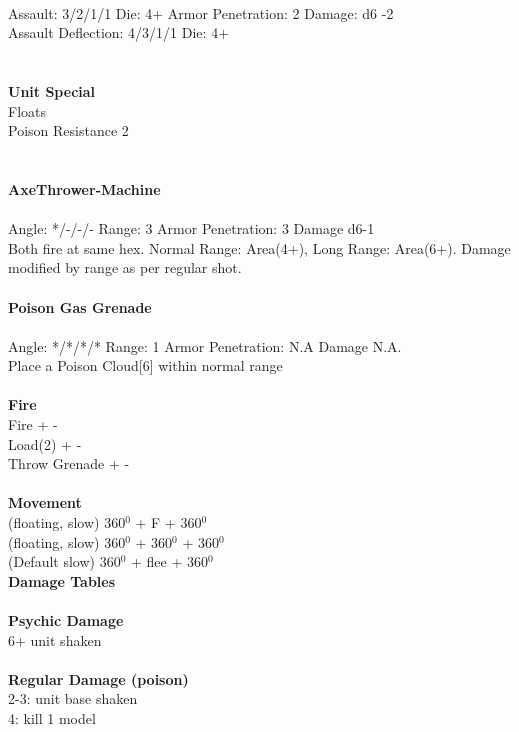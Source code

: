 \ \\
Assault: 3/2/1/1 Die: 4+ Armor Penetration: 2 Damage: d6 -2  \\
Assault Deflection: 4/3/1/1 Die: 4+\\
\indent  \\
\ \\

{\bf Unit Special} \\
Floats\\ Poison Resistance 2 \\ 
\ \\
\ \\
{\bf AxeThrower-Machine } \\
\ \\
Angle: */-/-/- Range: 3 Armor Penetration: 3 Damage d6-1 \\
\indent Both fire at same hex. Normal Range: Area(4+), Long Range: Area(6+). Damage modified by range as per regular shot. \\



\ \\
{\bf Poison Gas Grenade } \\
\ \\
Angle: */*/*/* Range: 1 Armor Penetration: N.A Damage N.A. \\
\indent Place a Poison Cloud[6] within normal range \\





\ \\ {\bf Fire } \\
Fire + - \\
Load(2) + - \\
Throw Grenade + - \\
\ \\ {\bf Movement } \\
(floating, slow) 360$^0$ + F + 360$^0$ \\
(floating, slow) 360$^0$ + 360$^0$ + 360$^0$ \\
(Default slow) 360$^0$ + flee + 360$^0$ \\



{\bf Damage Tables} \\
\ \\ {\bf Psychic Damage } \\
6+ unit shaken \\
\ \\ {\bf Regular Damage (poison) } \\
2-3: unit base shaken \\
4: kill 1 model \\


